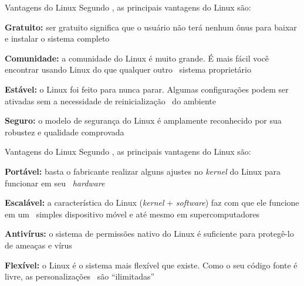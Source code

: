 \documentclass{beamer}
\begin{document}
    \begin{frame}[t]{Vantagens do Linux}
      Segundo \cite{SW2010}, as principais vantagens do Linux são: 
      \begin{itemize}
	\vspace{\baselineskip}
	{\item \textbf{Gratuito:}\uncover<3-> { ser gratuito significa que o usuário não terá nenhum ônus para baixar e instalar o sistema completo}}
	{\item \textbf{Comunidade:}\uncover<5-> { a comunidade do Linux é muito grande. É mais fácil você encontrar usando Linux do que qualquer outro \
						  sistema proprietário}}
	{\item \textbf{Estável:}\uncover<7-> { o Linux foi feito para nunca parar. Algumas configurações podem ser ativadas sem a necessidade de reinicialização \
                                               do ambiente}}
	\uncover<8->
	{\item \textbf{Seguro:}\uncover<9-> { o modelo de segurança do Linux é amplamente reconhecido por sua robustez e qualidade comprovada}}
      \end{itemize}
   \end{frame}

    \begin{frame}[t]{Vantagens do Linux}
      Segundo \cite{SW2010}, as principais vantagens do Linux são: 
      \begin{itemize}
	\vspace{\baselineskip}
	\uncover<2->
	{\item \textbf{Portável:}\uncover<3-> { basta o fabricante realizar alguns ajustes no \textit{kernel} do Linux para funcionar em seu \
                                                \textit{hardware}}}
	{\item \textbf{Escalável:}\uncover<5-> { a característica do Linux (\textit{kernel} + \textit{software}) faz com que ele funcione em um \
						 simples dispositivo móvel e até mesmo em supercomputadores}}
	\uncover<6->
	{\item \textbf{Antivírus:}\uncover<7-> { o sistema de permissões nativo do Linux é suficiente para protegê-lo de ameaças e vírus}}
	\uncover<8->
	{\item \textbf{Flexível:}\uncover<9-> { o Linux é o sistema mais flexível que existe. Como o seu código fonte é livre, as personalizações \
						são ``ilimitadas''}}
      \end{itemize}
   \end{frame}
 
\end{document}
